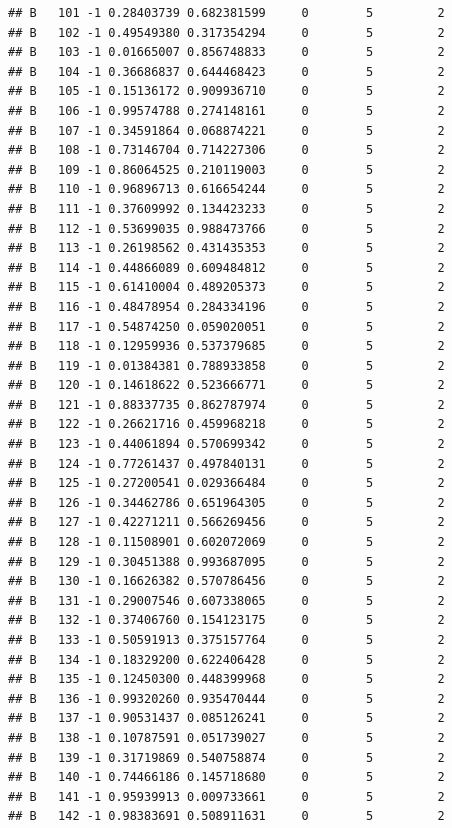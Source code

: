 \documentclass{article}\usepackage[]{graphicx}\usepackage[]{color}
\makeatletter
\newenvironment{kframe}{%
 \def\at@end@of@kframe{}%
 \ifinner\ifhmode%
  \def\at@end@of@kframe{\end{minipage}}%
  \begin{minipage}{\columnwidth}%
 \fi\fi%
 \def\FrameCommand##1{\hskip\@totalleftmargin \hskip-\fboxsep
 \colorbox{shadecolor}{##1}\hskip-\fboxsep
     \hskip-\linewidth \hskip-\@totalleftmargin \hskip\columnwidth}%
 \MakeFramed {\advance\hsize-\width
   \@totalleftmargin\z@ \linewidth\hsize
   \@setminipage}}%
 {\par\unskip\endMakeFramed%
 \at@end@of@kframe}
\newenvironment{knitrout}{}{} %
\makeatother
\begin{document}
\begin{knitrout}
\begin{kframe}
\begin{verbatim}
## B   101 -1 0.28403739 0.682381599     0        5         2
## B   102 -1 0.49549380 0.317354294     0        5         2
## B   103 -1 0.01665007 0.856748833     0        5         2
## B   104 -1 0.36686837 0.644468423     0        5         2
## B   105 -1 0.15136172 0.909936710     0        5         2
## B   106 -1 0.99574788 0.274148161     0        5         2
## B   107 -1 0.34591864 0.068874221     0        5         2
## B   108 -1 0.73146704 0.714227306     0        5         2
## B   109 -1 0.86064525 0.210119003     0        5         2
## B   110 -1 0.96896713 0.616654244     0        5         2
## B   111 -1 0.37609992 0.134423233     0        5         2
## B   112 -1 0.53699035 0.988473766     0        5         2
## B   113 -1 0.26198562 0.431435353     0        5         2
## B   114 -1 0.44866089 0.609484812     0        5         2
## B   115 -1 0.61410004 0.489205373     0        5         2
## B   116 -1 0.48478954 0.284334196     0        5         2
## B   117 -1 0.54874250 0.059020051     0        5         2
## B   118 -1 0.12959936 0.537379685     0        5         2
## B   119 -1 0.01384381 0.788933858     0        5         2
## B   120 -1 0.14618622 0.523666771     0        5         2
## B   121 -1 0.88337735 0.862787974     0        5         2
## B   122 -1 0.26621716 0.459968218     0        5         2
## B   123 -1 0.44061894 0.570699342     0        5         2
## B   124 -1 0.77261437 0.497840131     0        5         2
## B   125 -1 0.27200541 0.029366484     0        5         2
## B   126 -1 0.34462786 0.651964305     0        5         2
## B   127 -1 0.42271211 0.566269456     0        5         2
## B   128 -1 0.11508901 0.602072069     0        5         2
## B   129 -1 0.30451388 0.993687095     0        5         2
## B   130 -1 0.16626382 0.570786456     0        5         2
## B   131 -1 0.29007546 0.607338065     0        5         2
## B   132 -1 0.37406760 0.154123175     0        5         2
## B   133 -1 0.50591913 0.375157764     0        5         2
## B   134 -1 0.18329200 0.622406428     0        5         2
## B   135 -1 0.12450300 0.448399968     0        5         2
## B   136 -1 0.99320260 0.935470444     0        5         2
## B   137 -1 0.90531437 0.085126241     0        5         2
## B   138 -1 0.10787591 0.051739027     0        5         2
## B   139 -1 0.31719869 0.540758874     0        5         2
## B   140 -1 0.74466186 0.145718680     0        5         2
## B   141 -1 0.95939913 0.009733661     0        5         2
## B   142 -1 0.98383691 0.508911631     0        5         2

\end{verbatim}
\end{kframe}
\end{knitrout}
\end{document}
